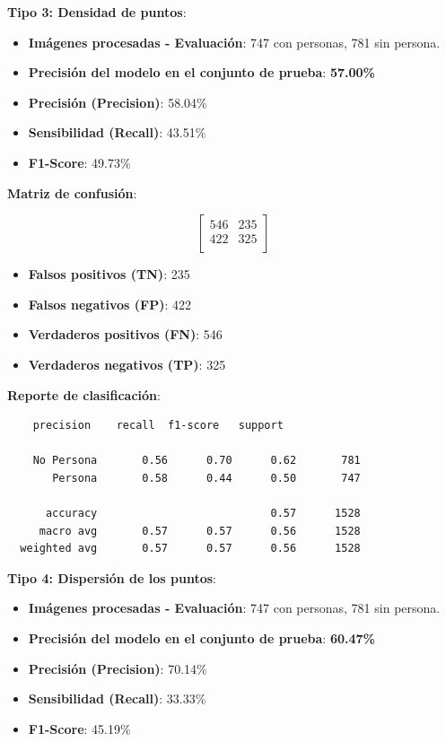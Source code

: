 \documentclass[a4paper]{article}
\begin{document}
\textbf{Tipo 3: Densidad de puntos}:

\begin{itemize}
    \item \textbf{Imágenes procesadas - Evaluación}: 747 con personas, 781 sin persona.
    \item \textbf{Precisión del modelo en el conjunto de prueba}: \textbf{57.00\%}
    \item \textbf{Precisión (Precision)}: 58.04\%
    \item \textbf{Sensibilidad (Recall)}: 43.51\%
    \item \textbf{F1-Score}: 49.73\%
\end{itemize}

\textbf{Matriz de confusión}:

\[
\begin{bmatrix}
    546 & 235 \\
    422 & 325 \\
\end{bmatrix}
\]

\begin{itemize}
    \item \textbf{Falsos positivos (TN)}: 235
    \item \textbf{Falsos negativos (FP)}: 422
    \item \textbf{Verdaderos positivos (FN)}: 546
    \item \textbf{Verdaderos negativos (TP)}: 325
\end{itemize}

\textbf{Reporte de clasificación}:

\begin{verbatim}
    precision    recall  f1-score   support

    No Persona       0.56      0.70      0.62       781
       Persona       0.58      0.44      0.50       747
  
      accuracy                           0.57      1528
     macro avg       0.57      0.57      0.56      1528
  weighted avg       0.57      0.57      0.56      1528
\end{verbatim}

\vspace{0.5cm}

\textbf{Tipo 4: Dispersión de los puntos}:

\begin{itemize}
    \item \textbf{Imágenes procesadas - Evaluación}: 747 con personas, 781 sin persona.
    \item \textbf{Precisión del modelo en el conjunto de prueba}: \textbf{60.47\%}
    \item \textbf{Precisión (Precision)}: 70.14\%
    \item \textbf{Sensibilidad (Recall)}: 33.33\%
    \item \textbf{F1-Score}: 45.19\%
\end{itemize}
\end{document}

